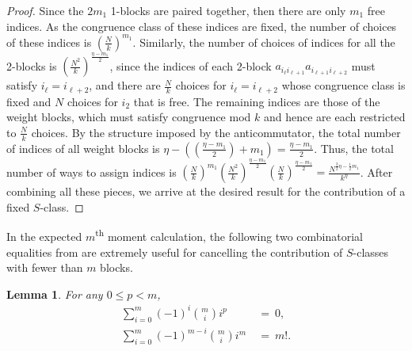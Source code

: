 \documentclass[11pt,reqno]{amsart}
\numberwithin{equation}{section}
\theoremstyle{plain}
\newtheorem{lemma}[thm]{Lemma}
\begin{document}
\begin{proof}
Since the $2m_1$ 1-blocks are paired together, then there are only $m_1$ free indices. As the congruence class of these indices are fixed, the number of choices of these indices is $(\frac{N}{k})^{m_1}$. Similarly, the number of choices of indices for all the 2-blocks is $(\frac{N^2}{k})^{\frac{\eta-m_1}{2}}$, since the indices of each 2-block $a_{i_\ell i_{\ell+1}}a_{i_{\ell+1}i_{\ell+2}}$ must satisfy $i_\ell=i_{\ell+2}$, and there are $\frac{N}{k}$ choices for $i_\ell=i_{\ell+2}$ whose congruence class is fixed and $N$ choices for $i_2$ that is free. The remaining indices are those of the weight blocks, which must satisfy congruence mod $k$ and hence are each restricted to $\frac{N}{k}$ choices. By the structure imposed by the anticommutator, the total number of indices of all weight blocks is $\eta-\left(\left(\frac{\eta-m_1}{2}\right)+m_1\right)=\frac{\eta-m_1}{2}$. Thus, the total number of ways to assign indices is
$\left(\frac{N}{k}\right)^{m_1} \left(\frac{N^2}{k}\right)^{\frac{\eta-m_1}{2}}\left(\frac{N}{k}\right)^{\frac{\eta-m_1}{2}}=\frac{N^{\frac{3}{2}\eta-\frac{1}{2}m_1}}{k^\eta}$. After combining all these pieces, we arrive at the desired result for the contribution of a fixed $S$-class.
\end{proof}

In the expected $m$\textsuperscript{th} moment calculation, the following two combinatorial equalities from \cite{split} are extremely useful for cancelling the contribution of $S$-classes with fewer than $m$ blocks.
\begin{lemma}\label{inequalities}
For any $0\leq p<m$,
\begin{align}
\sum_{i=0}^m(-1)^i\binom{m}{i}i^p &\ = \ 0, \\
\sum_{i=0}^m(-1)^{m-i}\binom{m}{i}i^m &\ = \ m!.
\end{align}
\end{lemma}
\end{document}
